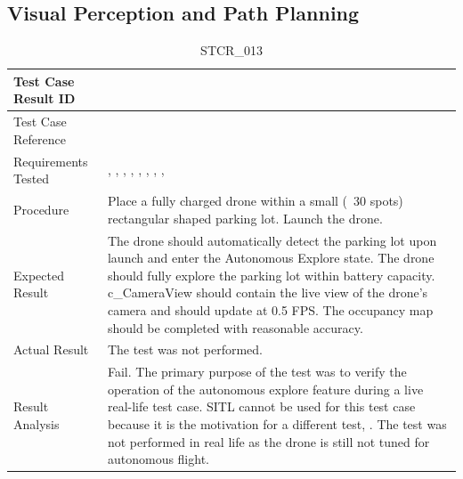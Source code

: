 \documentclass[12pt, titlepage]{article}
\begin{document}
\clearpage

\subsection{Visual Perception and Path Planning}

\begin{table}[!h]
\begin{center}
\caption {STCR\_013}
\label{tab:STCR_013}
\begin{tabular}{ | m{3.2cm} | m{12.2cm} | } 
\hline
Test Case Result ID & \nameref{tab:STCR_013} \\ 
\hline
Test Case Reference & \nameref{tab:STC_013}  \\ 
\hline
Requirements Tested & \nameref{GEN_005}, \nameref{GEN_006}, \nameref{STA_003}, \nameref{GEN_001}, \nameref{GEN_002}, \nameref{STA_003}, \nameref{TRANS_004}, \nameref{PERF_004}, \nameref{PERF_001} \\ 
\hline
Procedure & Place a fully charged drone within a small (~30 spots) rectangular shaped parking lot.  Launch the drone. \\
\hline
Expected Result & The drone should automatically detect the parking lot upon launch and enter the Autonomous Explore state. The drone should fully explore the parking lot within battery capacity. c\_CameraView should contain the live view of the drone's camera and should update at 0.5 FPS. The occupancy map should be completed with reasonable accuracy.  \\ 
\hline
Actual Result &  The test was not performed. \\
\hline
Result Analysis & Fail. The primary purpose of the test was to verify the operation of the  autonomous explore feature during a live real-life test case. SITL cannot be used for this test case because it is the motivation for a different test, \nameref{tab:STC_016}. The test was not performed in real life as the drone is still not tuned for autonomous flight.  \\ 
\hline
\end{tabular}
\end{center}
\end{table}
\end{document}
